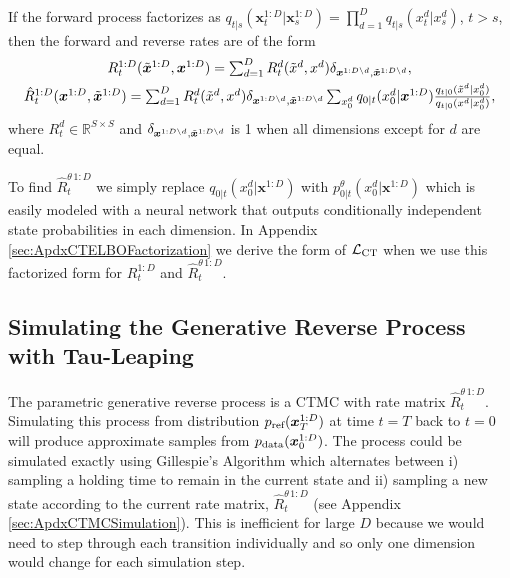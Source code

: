 \documentclass{article}
\begin{document}
\begin{proposition}
\label{prop:dimfactorize}
If the forward process factorizes as $q_{t|s}(\bm{x}_t^{1:D} | \bm{x}_s^{1:D}) = \prod_{d=1}^D q_{t|s}(x_t^d | x_s^d)$, $t>s$, then the forward and reverse rates are of the form
\begin{gather}
    \textstyle R_t^{1:D}(\tilde{\bm{x}}^{1:D}, \bm{x}^{1:D}) = \sum_{d=1}^D R_t^d(\tilde{x}^d, x^d) \delta_{\bm{x}^{1:D \backslash d}, \tilde{\bm{x}}^{1:D \backslash d}},\\
    \textstyle \hat{R}_t^{1:D}(\bm{x}^{1:D}, \tilde{\bm{x}}^{1:D}) = \sum_{d=1}^D R_t^d(\tilde{x}^d, x^d) \delta_{\bm{x}^{1:D \backslash d}, \tilde{\bm{x}}^{1:D \backslash d}} \sum_{x_0^d} q_{0|t}(x_0^d | \bm{x}^{1:D}) \frac{q_{t|0}(\tilde{x}^d | x_0^d)}{q_{t|0}(x^d | x_0^d)},
\end{gather}
where $R_t^d \in \mathbb{R}^{S \times S}$ and $\delta_{\bm{x}^{1:D \backslash d}, \tilde{\bm{x}}^{1:D \backslash d}}$ is 1 when all dimensions except for $d$ are equal.
\end{proposition}


To find $\hat{R}_t^{\theta \, 1:D}$ we simply replace $q_{0|t}(x_0^d | \bm{x}^{1:D})$ with $p_{0|t}^\theta(x_0^d | \bm{x}^{1:D})$ which is easily modeled with a neural network that outputs conditionally independent state probabilities in each dimension. In Appendix \ref{sec:ApdxCTELBOFactorization} we derive the form of $\mathcal{L}_{\textup{CT}}$ when we use this factorized form for $R_t^{1:D}$ and $\hat{R}_t^{\theta \, 1:D}$.














\subsection{Simulating the Generative Reverse Process with Tau-Leaping} \label{sec:TauLeaping}


The parametric generative reverse process is a CTMC with rate matrix $\hat{R}_t^{\theta \, 1:D}$. Simulating this process from distribution $p_{\textrm{ref}}(\bm{x}_T^{1:D})$ at time $t=T$ back to $t=0$ will produce approximate samples from $p_{\textup{data}}(\bm{x}_0^{1:D})$. The process could be simulated exactly using Gillespie's Algorithm \cite{gillespie1976general, gillespie1977exact, wilkinson2018stochastic} which alternates between i) sampling a holding time to remain in the current state and ii) sampling a new state according to the current rate matrix, $\hat{R}_t^{\theta \, 1:D}$ (see Appendix \ref{sec:ApdxCTMCSimulation}). This is inefficient for large $D$ because we would need to step through each transition individually and so only one dimension would change for each simulation step. 
\end{document}
